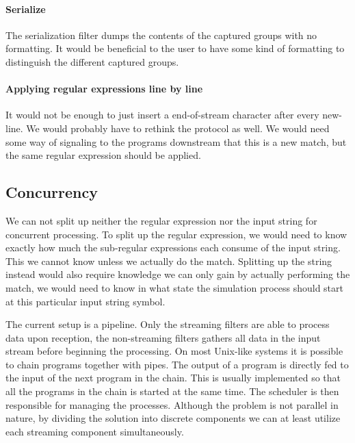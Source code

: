 \paragraph{Serialize} The serialization filter
dumps the contents of the captured groups with no formatting. It would
be beneficial to the user to have some kind of formatting to
distinguish the different captured groups.

\paragraph{Applying regular expressions line by line} It would not be
enough to just insert a end-of-stream character after every
new-line. We would probably have to rethink the protocol as well. We
would need some way of signaling to the programs downstream that this
is a new match, but the same regular expression should be applied. 

\subsection{Concurrency}

We can not split up neither the regular expression nor the input
string for concurrent processing. To split up the regular expression,
we would need to know exactly how much the sub-regular expressions
each consume of the input string. This we cannot know unless we
actually do the match. Splitting up the string instead would also
require knowledge we can only gain by actually performing the match,
we would need to know in what state the simulation process should
start at this particular input string symbol. 

The current setup is a pipeline. Only the streaming filters are able
to process data upon reception, the non-streaming filters gathers all
data in the input stream before beginning the processing. On most
Unix-like systems it is possible to chain programs together with
pipes. The output of a program is directly fed to the input of the
next program in the chain. This is usually implemented so that all the
programs in the chain is started at the same time. The scheduler is
then responsible for managing the processes. Although the problem is
not parallel in nature, by dividing the solution into discrete
components we can at least utilize each streaming component
simultaneously.




